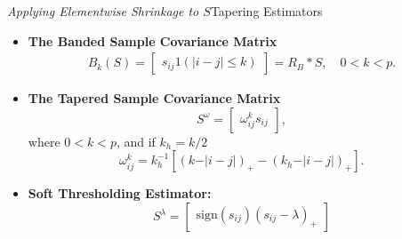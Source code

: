 \begin{frame}{\textit{Applying Elementwise Shrinkage to $S$}}{Tapering Estimators}\label{shrinkage-estimators}
	\footnotesize
	\begin{itemize}
 	\item \textbf{The Banded Sample Covariance Matrix} 
	\begin{align*}%
		B_k\left(S\right) = \begin{bmatrix} s_{ij} 1\left(\vert i-j \vert \le k\right) \end{bmatrix} = R_B \ast S,\quad 0 < k < p.
		\end{align*}
	\item \textbf{The Tapered Sample Covariance Matrix} 
		 	\begin{equation*}%
			S^{\omega} =  \begin{bmatrix} \omega_{ij}^k s_{ij} \end{bmatrix},
			\end{equation*}
		where $0 < k < p$, and if $k_h = k/2$ 
		\begin{equation*}
		\omega^k_{ij} = k_h^{-1} \left[ \left( k - \vert i-j\vert\right)_+ - \left(k_h - \vert i-j\vert\right)_+ \right].
		\end{equation*}
	\item \textbf{Soft Thresholding Estimator:} 
			\begin{equation*}%
			S^{\lambda} =   \begin{bmatrix} \mbox{sign}\left(s_{ij}\right) \left(s_{ij} - \lambda\right)_+ \end{bmatrix}
			\end{equation*}	\footnotesize
	\end{itemize}
\hyperlink{simulation-studies-benchmark-estimators}{}
\end{frame}




